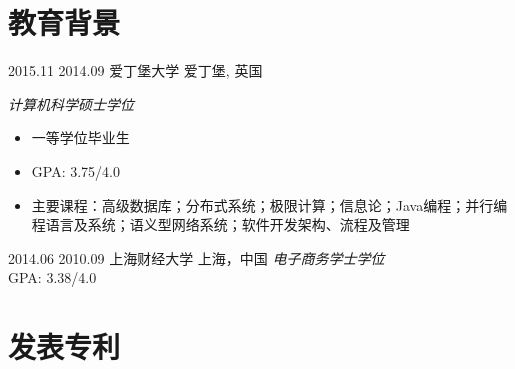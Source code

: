 \documentclass[]{friggeri-cv-cn} %
\begin{document}

\section{教育背景}

\begin{entrylist}
\entry
{2015.11}
{2014.09}
{爱丁堡大学}
{爱丁堡, 英国}
{
	\emph{计算机科学硕士学位}
	\begin{itemize}
		\item 一等学位毕业生
		\item GPA: 3.75/4.0
		\item 主要课程：高级数据库；分布式系统；极限计算；信息论；Java编程；并行编程语言及系统；语义型网络系统；软件开发架构、流程及管理
	\end{itemize}
}
\entry
{2014.06}
{2010.09}
{上海财经大学}
{上海，中国}
{
	\emph{电子商务学士学位}\\
	GPA: 3.38/4.0
}
\end{entrylist}

%
\section{发表专利}


\end{document}
